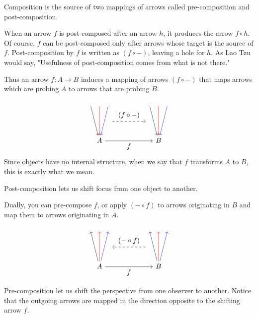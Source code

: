 \documentclass[DaoFP]{subfiles}
\begin{document}
Composition is the source of two mappings of arrows called pre-composition and post-composition. 

When an arrow $f$ is post-composed after an arrow $h$, it produces the arrow $f \circ h$. Of course, $f$ can be post-composed only after arrows whose target is the source of $f$. Post-composition by $f$ is written as $(f \circ -)$, leaving a hole for $h$. As Lao Tzu would say, "Usefulness of post-composition comes from what is not there."

Thus an arrow $f \colon A \to B$ induces a mapping of arrows $(f \circ -)$ that maps arrows which are probing $A$ to arrows that are probing $B$. 

\[
 \begin{tikzcd}
 \node (a1) at (0, 2) {};
 \node (a2) at (-0.5, 2) {};
 \node (a3) at (0.5, 2) {};
 \node (aa) at (0.5, 1) {};
 \node(a) at (0, 0) {A};
 \draw[->, red] (a1) -- (a);
 \draw[->] (a2) -- (a);
 \draw[->, blue] (a3) -- (a);
 \node (b1) at (3+0, 2) {};
 \node (b2) at (3-0.5, 2) {};
 \node (b3) at (3+0.5, 2) {};
 \node (bb) at (2.5, 1) {};
 \node(b) at (3, 0) {B};
 \draw[->, red] (b1) -- (b);
 \draw[->] (b2) -- (b);
 \draw[->, blue] (b3) -- (b);
 \draw[->] (a) -- node[below]{f} (b);
 \draw[->, dashed] (aa) -- node[above]{(f \circ -)} (bb);
  \end{tikzcd}
\]
Since objects have no internal structure, when we say that $f$ transforms $A$ to $B$, this is exactly what we mean. 

Post-composition lets us shift focus from one object to another.

Dually, you can pre-compose $f$, or apply $(- \circ f)$ to arrows originating in $B$ and map them to arrows originating in $A$. 

\[
 \begin{tikzcd}
 \node (a1) at (0, 2) {};
 \node (a2) at (-0.5, 2) {};
 \node (a3) at (0.5, 2) {};
 \node (aa) at (0.5, 1) {};
 \node(a) at (0, 0) {A};
 \draw[<-, red] (a1) -- (a);
 \draw[<-] (a2) -- (a);
 \draw[<-, blue] (a3) -- (a);
 \node (b1) at (3+0, 2) {};
 \node (b2) at (3-0.5, 2) {};
 \node (b3) at (3+0.5, 2) {};
 \node (bb) at (2.5, 1) {};
 \node(b) at (3, 0) {B};
 \draw[<-, red] (b1) -- (b);
 \draw[<-] (b2) -- (b);
 \draw[<-, blue] (b3) -- (b);
 \draw[->] (a) -- node[below]{f} (b);
 \draw[->, dashed] (bb) -- node[above]{(- \circ f)} (aa);
  \end{tikzcd}
\]

Pre-composition let us shift the perspective from one observer to another. Notice that the outgoing arrows are mapped in the direction opposite to the shifting arrow $f$.
\end{document}
